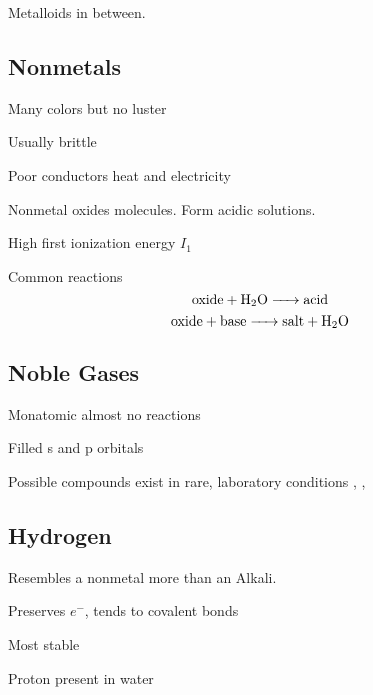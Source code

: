 Metalloids in between.


\begin{mdframed}
\subsection{Nonmetals}
\begin{multicols}{2}
\begin{compactdesc}
\item[Many colors] but no luster
\item[Usually brittle]
\item[Poor conductors] heat and electricity
\item[Nonmetal oxides] molecules. Form acidic solutions.
\item[High first] ionization energy $I_1$
\item[Common reactions]
    \[\ce{oxide + H2O -> acid} \]
    \[\ce{oxide + base -> salt + H2O} \]
\end{compactdesc}

\subsection{Noble Gases}
\begin{compactdesc}
\item[Monatomic] almost no reactions
\item[Filled] s and p orbitals
\item[Possible compounds] exist in rare, laboratory conditions
    , , 
\end{compactdesc}



\subsection{Hydrogen}
\begin{compactdesc}
\item[Resembles a] nonmetal more than an Alkali.
\item[Preserves] $e^-$, tends to covalent bonds
\item[Most stable] 
\item[Proton]  present in water
\end{compactdesc}



\end{multicols}
\end{mdframed}
